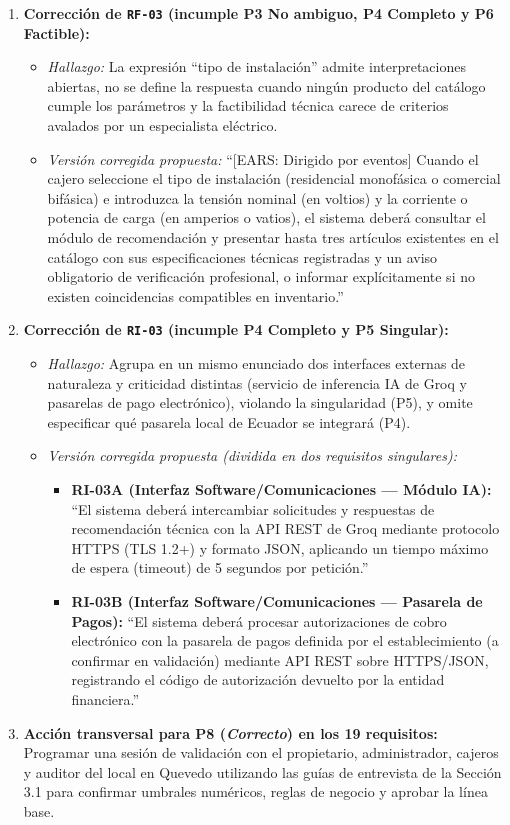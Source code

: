 \documentclass[onecolumn,12pt]{IEEEtran}
\begin{document}
	\begin{enumerate}
		\item \textbf{Correcci\'on de \texttt{RF-03} (incumple P3 No ambiguo, P4 Completo y P6 Factible):}
		\begin{itemize}
			\item \textit{Hallazgo:} La expresi\'on ``tipo de instalaci\'on'' admite interpretaciones abiertas, no se define la respuesta cuando ning\'un producto del cat\'alogo cumple los par\'ametros y la factibilidad t\'ecnica carece de criterios avalados por un especialista el\'ectrico.
			\item \textit{Versi\'on corregida propuesta:} ``[EARS: Dirigido por eventos] Cuando el cajero seleccione el tipo de instalaci\'on (residencial monof\'asica o comercial bif\'asica) e introduzca la tensi\'on nominal (en voltios) y la corriente o potencia de carga (en amperios o vatios), el sistema deber\'a consultar el m\'odulo de recomendaci\'on y presentar hasta tres art\'iculos existentes en el cat\'alogo con sus especificaciones t\'ecnicas registradas y un aviso obligatorio de verificaci\'on profesional, o informar expl\'icitamente si no existen coincidencias compatibles en inventario.''
		\end{itemize}
		\item \textbf{Correcci\'on de \texttt{RI-03} (incumple P4 Completo y P5 Singular):}
		\begin{itemize}
			\item \textit{Hallazgo:} Agrupa en un mismo enunciado dos interfaces externas de naturaleza y criticidad distintas (servicio de inferencia IA de Groq y pasarelas de pago electr\'onico), violando la singularidad (P5), y omite especificar qu\'e pasarela local de Ecuador se integrar\'a (P4).
			\item \textit{Versi\'on corregida propuesta (dividida en dos requisitos singulares):}
			\begin{itemize}
				\item \textbf{RI-03A (Interfaz Software/Comunicaciones --- M\'odulo IA):} ``El sistema deber\'a intercambiar solicitudes y respuestas de recomendaci\'on t\'ecnica con la API REST de Groq mediante protocolo HTTPS (TLS 1.2+) y formato JSON, aplicando un tiempo m\'aximo de espera (timeout) de 5 segundos por petici\'on.''
				\item \textbf{RI-03B (Interfaz Software/Comunicaciones --- Pasarela de Pagos):} ``El sistema deber\'a procesar autorizaciones de cobro electr\'onico con la pasarela de pagos definida por el establecimiento (a confirmar en validaci\'on) mediante API REST sobre HTTPS/JSON, registrando el c\'odigo de autorizaci\'on devuelto por la entidad financiera.''
			\end{itemize}
		\end{itemize}
		\item \textbf{Acci\'on transversal para P8 (\textit{Correcto}) en los 19 requisitos:} Programar una sesi\'on de validaci\'on con el propietario, administrador, cajeros y auditor del local en Quevedo utilizando las gu\'ias de entrevista de la Secci\'on 3.1 para confirmar umbrales num\'ericos, reglas de negocio y aprobar la l\'inea base.
	\end{enumerate}
	
\end{document}
